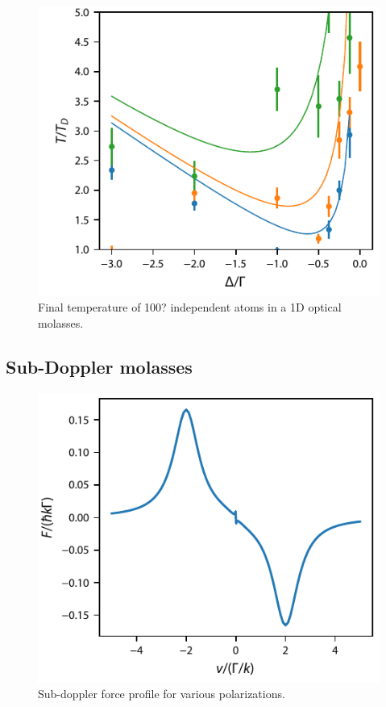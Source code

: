\documentclass[final,5p,times,twocolumn]{elsarticle}
\begin{document}
\begin{figure}
	\center
	\includegraphics{figs/final_temperature_two_level_1D_molasses_rate_eqn.pdf}

	\caption{\label{fig:doppler_limit} Final temperature of 100? independent atoms in a 1D optical molasses.}
\end{figure}



\subsection{Sub-Doppler molasses}

\begin{figure}
	\center
	\includegraphics{figs/F2_to_F3_subDoppler_force}
	\caption{\label{fig:sub_doppler_force} Sub-doppler force profile for various polarizations.}
\end{figure}
\end{document}
